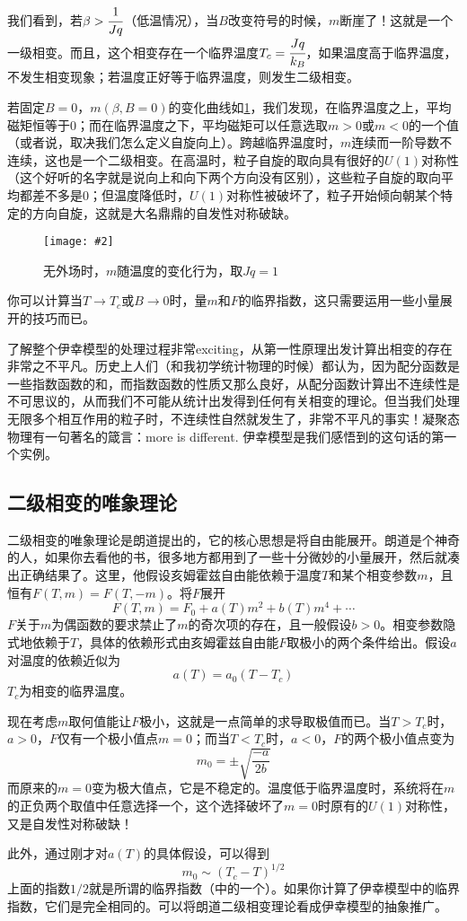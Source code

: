 \documentclass[a4paper,11pt]{ctexart}
\newcommand{\beq}{\begin{equation}}
\newcommand{\eeq}{\end{equation}}
\newcommand{\red}{\color{red}}
\newcommand{\cpic}[2]{
\begin{center}
\texttt{[image: \#2]}
\end{center}
}
\newcommand{\cpicn}[3]
{
\begin{figure}[h!]
\cpic{#1}{#2}
\caption{#3\label{#2}}
\end{figure}
}
\begin{document}
\par
我们看到，若$\beta > \cfrac{1}{Jq}$（低温情况），当$B$改变符号的时候，$m$断崖了！这就是一个一级相变。而且，这个相变存在一个临界温度$T_c = \cfrac{Jq}{k_B}$，如果温度高于临界温度，不发生相变现象；若温度正好等于临界温度，则发生二级相变。
\par
若固定$B = 0$，$m(\beta,B=0)$的变化曲线如\cref{isingtrans}，我们发现，在临界温度之上，平均磁矩恒等于0；而在临界温度之下，平均磁矩可以任意选取$m>0$或$m<0$的一个值（或者说，取决我们怎么定义自旋向上）。跨越临界温度时，$m$连续而一阶导数不连续，这也是一个二级相变。在高温时，粒子自旋的取向具有很好的$U(1)$对称性（这个好听的名字就是说向上和向下两个方向没有区别），这些粒子自旋的取向平均都差不多是0；但温度降低时，$U(1)$对称性被破坏了，粒子开始倾向朝某个特定的方向自旋，这就是大名鼎鼎的{\red 自发性对称破缺}。
\cpicn{0.3}{isingtrans}{无外场时，$m$随温度的变化行为，取$Jq = 1$}
\par
你可以计算当$T\to T_c$或$B \to 0$时，量$m$和$F$的临界指数，这只需要运用一些小量展开的技巧而已。
\par
了解整个伊幸模型的处理过程非常exciting，从第一性原理出发计算出相变的存在非常之不平凡。历史上人们（和我初学统计物理的时候）都认为，因为配分函数是一些指数函数的和，而指数函数的性质又那么良好，从配分函数计算出不连续性是不可思议的，从而我们不可能从统计出发得到任何有关相变的理论。但当我们处理无限多个相互作用的粒子时，不连续性自然就发生了，非常不平凡的事实！凝聚态物理有一句著名的箴言：more is different. 伊幸模型是我们感悟到的这句话的第一个实例。

\subsection{二级相变的唯象理论}
二级相变的唯象理论是朗道提出的，它的核心思想是将自由能展开。朗道是个神奇的人，如果你去看他的书，很多地方都用到了一些十分微妙的小量展开，然后就凑出正确结果了。这里，他假设亥姆霍兹自由能依赖于温度$T$和某个相变参数$m$，且恒有$F(T,m) = F(T,-m)$。将$F$展开
\beq
F(T,m) = F_0 + a(T)m^2 + b(T)m^4 + \cdots
\eeq
$F$关于$m$为偶函数的要求禁止了$m$的奇次项的存在，且一般假设$b>0$。相变参数隐式地依赖于$T$，具体的依赖形式由亥姆霍兹自由能$F$取极小的两个条件给出。假设$a$对温度的依赖近似为
\beq
a(T) = a_0 (T-T_c)
\eeq
$T_c$为相变的临界温度。
\par
现在考虑$m$取何值能让$F$极小，这就是一点简单的求导取极值而已。当$T>T_c$时，$a>0$，$F$仅有一个极小值点$m=0$；而当$T<T_c$时，$a<0$，$F$的两个极小值点变为
\beq
m_0 = \pm \sqrt{\frac{-a}{2b}}
\eeq
而原来的$m=0$变为极大值点，它是不稳定的。温度低于临界温度时，系统将在$m$的正负两个取值中任意选择一个，这个选择破坏了$m=0$时原有的$U(1)$对称性，又是自发性对称破缺！
\par
此外，通过刚才对$a(T)$的具体假设，可以得到
\beq
m_0 \sim (T_c - T)^{1/2}
\eeq
上面的指数$1/2$就是所谓的临界指数（中的一个）。如果你计算了伊幸模型中的临界指数，它们是完全相同的。可以将朗道二级相变理论看成伊幸模型的抽象推广。
\end{document}
